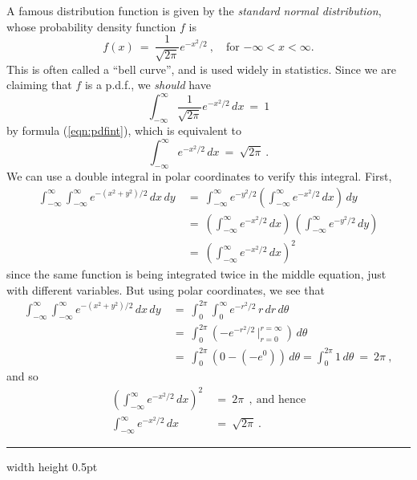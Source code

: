 \begin{exmp}\label{exmp:normaldistrib}
 A famous distribution function is given by the \emph{standard normal distribution}, whose probability density function
 $f$ is
 \begin{equation}\label{eqn:normalpdf}
  f(x) ~=~ \frac{1}{\sqrt{2\pi}} e^{-x^2 /2}~, \quad \text{for $-\infty < x < \infty$.}
 \end{equation}
 This is often called a ``bell curve'', and is used widely in statistics. Since we are claiming that $f$ is a p.d.f.,
 we \emph{should} have
 \begin{equation}
  \int_{-\infty}^{\infty} \frac{1}{\sqrt{2\pi}} e^{-x^2 /2}\,dx ~=~ 1
 \end{equation}
 by formula (\ref{eqn:pdfint}), which is equivalent to
 \begin{equation}
  \int_{-\infty}^{\infty} e^{-x^2 /2}\,dx ~=~ \sqrt{2\pi} ~.
 \end{equation}
 We can use a double integral in polar coordinates to verify this integral. First,
 \begin{align*}
  \int_{-\infty}^{\infty} \int_{-\infty}^{\infty} e^{-(x^2 + y^2 )/2}\,dx\,dy ~&=~
  \int_{-\infty}^{\infty} e^{-y^2 /2} \left( \int_{-\infty}^{\infty} e^{-x^2 /2}\,dx \right) \,dy\\[6pt]
  &=~ \left( \int_{-\infty}^{\infty} e^{-x^2 /2}\,dx \right)\,\left( \int_{-\infty}^{\infty} e^{-y^2 /2}\,dy \right)\\[6pt]
  &=~ \left( \int_{-\infty}^{\infty} e^{-x^2 /2}\,dx \right)^2
 \end{align*}
 since the same function is being integrated twice in the middle equation, just with different variables. But using
 polar coordinates, we see that
 \begin{align*}
  \int_{-\infty}^{\infty} \int_{-\infty}^{\infty} e^{-(x^2 + y^2 )/2}\,dx\,dy
  ~&=~ \int_0^{2\pi} \int_0^{\infty} e^{-r^2 /2}\,r\,dr\,d\theta\\[6pt]
  &=~ \int_0^{2\pi} \left( -e^{-r^2 /2} \,\Bigg|_{r=0}^{r=\infty} \,\right)\,d\theta\\[6pt]
  &=~ \int_0^{2\pi} (0 - (-e^0))\,d\theta = \int_0^{2\pi} 1\,d\theta ~=~ 2\pi ~,
 \end{align*}
 and so
 \begin{align*}
  \left( \int_{-\infty}^{\infty} e^{-x^2 /2}\,dx \right)^2 ~&=~ 2\pi ~~,~\text{and hence}\\[6pt]
  \int_{-\infty}^{\infty} e^{-x^2 /2}\,dx ~&=~ \sqrt{2\pi} ~.
 \end{align*}
\end{exmp}
\hrule width \textwidth height 0.5pt

